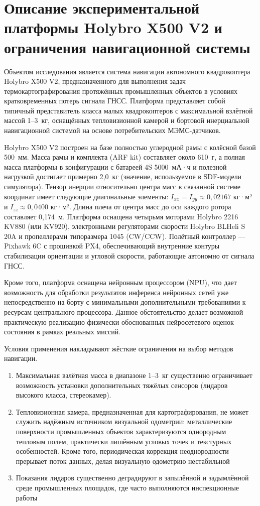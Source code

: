 \section{Описание экспериментальной платформы Holybro X500 V2 и ограничения навигационной системы}
\label{sec:platform}

Объектом исследования является система навигации автономного квадрокоптера Holybro X500 V2, предназначенного для выполнения задач термокартографирования протяжённых промышленных объектов в условиях кратковременных потерь сигнала ГНСС. Платформа представляет собой типичный представитель класса малых квадрокоптеров с максимальной взлётной массой 1--3~кг, оснащённых тепловизионной камерой и бортовой инерциальной навигационной системой на основе потребительских МЭМС-датчиков.

Holybro X500 V2 построен на базе полностью углеродной рамы с колёсной базой 500~мм. Масса рамы и комплекта (ARF kit) составляет около 610~г, а полная масса платформы в конфигурации с батареей 4S 5000~мА·ч и полезной нагрузкой достигает примерно 2,0~кг (значение, используемое в SDF-модели симулятора). Тензор инерции относительно центра масс в связанной системе координат имеет следующие диагональные элементы: \(I_{xx} = I_{yy} \approx 0{,}02167\) кг·м² и \(I_{zz} \approx 0{,}0400\) кг·м². Длина плеча от центра масс до оси каждого ротора составляет 0,174~м. Платформа оснащена четырьмя моторами Holybro 2216 KV880 (или KV920), электронными регуляторами скорости Holybro BLHeli S 20A и пропеллерами типоразмера 1045 (CW/CCW). Полётный контроллер — Pixhawk 6C с прошивкой PX4, обеспечивающий внутренние контуры стабилизации ориентации и угловой скорости, работающие автономно от сигнала ГНСС.

Кроме того, платформа оснащена нейронным процессором (NPU), что дает возможность для обработки результатов инференса нейронных сетей уже непосредственно на борту с минимальными дополнительными требованиями к ресурсам центрального процессора. Данное обстоятельство делает возможной практическую реализацию физически обоснованных нейросетевого оценок состояния в рамках реальных миссий.

Условия применения накладывают жёсткие ограничения на выбор методов навигации. 
\begin{enumerate}
	\item Максимальная взлётная масса в диапазоне 1--3~кг существенно ограничивает возможность установки дополнительных тяжёлых сенсоров (лидаров высокого класса, стереокамер).
	\item Тепловизионная камера, предназначенная для картографирования, не может служить надёжным источником визуальной одометрии: металлические поверхности промышленных объектов характеризуются однородным тепловым полем, практически лишённым угловых точек и текстурных особенностей. Кроме того, периодическая коррекция неоднородности прерывает поток данных, делая визуальную одометрию нестабильной
	\item Показания лидаров существенно деградируют в запылённой и задымлённой среде промышленных площадок, где часто выполняются инспекционные работы
\end{enumerate}


